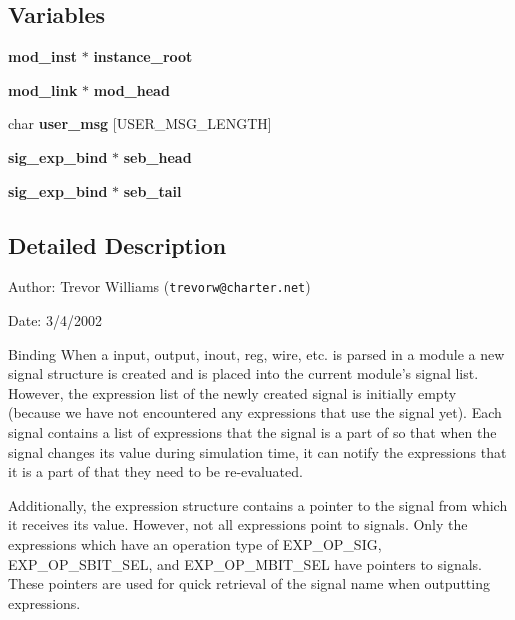 \subsection*{Variables}
\begin{CompactItemize}
\item 
{\bf mod\_\-inst} $\ast$ {\bf instance\_\-root}
\item 
{\bf mod\_\-link} $\ast$ {\bf mod\_\-head}
\item 
char {\bf user\_\-msg} [USER\_\-MSG\_\-LENGTH]
\item 
{\bf sig\_\-exp\_\-bind} $\ast$ {\bf seb\_\-head}
\item 
{\bf sig\_\-exp\_\-bind} $\ast$ {\bf seb\_\-tail}
\end{CompactItemize}


\subsection{Detailed Description}
\begin{Desc}
\item[Author:]Trevor Williams ({\tt trevorw@charter.net}) \end{Desc}
\begin{Desc}
\item[Date:]3/4/2002\end{Desc}
\begin{Desc}
\item[Binding]When a input, output, inout, reg, wire, etc. is parsed in a module a new signal structure is created and is placed into the current module's signal list. However, the expression list of the newly created signal is initially empty (because we have not encountered any expressions that use the signal yet). Each signal contains a list of expressions that the signal is a part of so that when the signal changes its value during simulation time, it can notify the expressions that it is a part of that they need to be re-evaluated.\end{Desc}
\begin{Desc}
\item[]Additionally, the expression structure contains a pointer to the signal from which it receives its value. However, not all expressions point to signals. Only the expressions which have an operation type of EXP\_\-OP\_\-SIG, EXP\_\-OP\_\-SBIT\_\-SEL, and EXP\_\-OP\_\-MBIT\_\-SEL have pointers to signals. These pointers are used for quick retrieval of the signal name when outputting expressions.\end{Desc}
